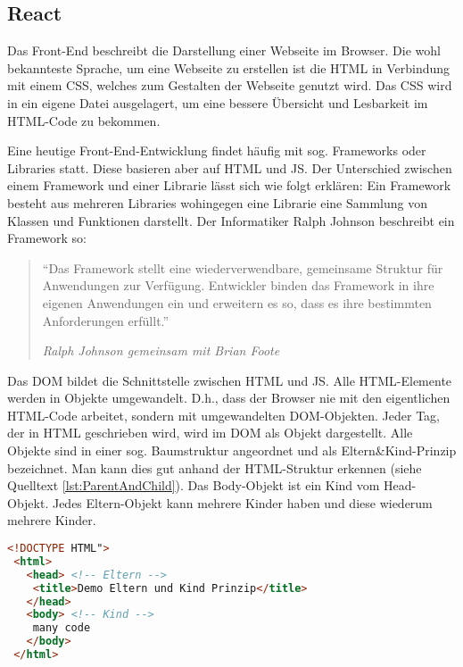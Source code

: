 \subsection{React}
\label{ssec:React}

Das Front-End beschreibt die Darstellung einer Webseite im Browser. Die wohl bekannteste Sprache, um eine Webseite zu erstellen ist die \ac{HTML} in Verbindung mit einem \ac{CSS}, welches zum Gestalten der Webseite genutzt wird. Das \ac{CSS} wird in ein eigene Datei ausgelagert, um eine bessere Übersicht und Lesbarkeit im \ac{HTML}-Code zu bekommen. 

Eine heutige Front-End-Entwicklung findet häufig mit sog. Frameworks oder Libraries statt. 
Diese basieren aber auf \ac{HTML} und \ac{JS}. 
Der Unterschied zwischen einem Framework und einer Librarie lässt sich wie folgt erklären: Ein Framework besteht aus mehreren Libraries wohingegen eine Librarie eine Sammlung von Klassen und Funktionen darstellt.\autocite{Libary_vs_Framework} Der Informatiker Ralph Johnson beschreibt ein Framework so: 
%
\begin{quote}
	\enquote{Das Framework stellt eine wiederverwendbare, gemeinsame Struktur für Anwendungen zur Verfügung. Entwickler binden das Framework in ihre eigenen Anwendungen ein und erweitern es so, dass es ihre bestimmten Anforderungen erfüllt.}
	\begin{center}{\textit{Ralph Johnson gemeinsam mit Brian Foote}}\end{center}
\end{quote}
%

Das \ac{DOM} bildet die Schnittstelle zwischen \ac{HTML} und \ac{JS}. Alle \ac{HTML}-Elemente werden in Objekte umgewandelt. 
D.h., dass der Browser nie mit den eigentlichen \ac{HTML}-Code arbeitet, sondern mit umgewandelten \ac{DOM}-Objekten. 
Jeder Tag, der in \ac{HTML} geschrieben wird, wird im \ac{DOM} als Objekt dargestellt. 
Alle Objekte sind in einer sog. Baumstruktur angeordnet und als Eltern\&Kind-Prinzip bezeichnet. 
Man kann dies gut anhand der \ac{HTML}-Struktur erkennen (siehe Quelltext \vref{lst:ParentAndChild}). 
Das Body-Objekt ist ein Kind vom Head-Objekt. Jedes Eltern-Objekt kann mehrere Kinder haben und diese wiederum mehrere Kinder. 
\begin{lstlisting}[caption={Eltern\&Kind-Prinzip},label={lst:ParentAndChild},language=HTML, showstringspaces={false}]
<!DOCTYPE HTML">
 <html>  
   <head> <!-- Eltern -->
    <title>Demo Eltern und Kind Prinzip</title> 
   </head>
   <body> <!-- Kind -->
    many code
   </body>
 </html>
\end{lstlisting}


